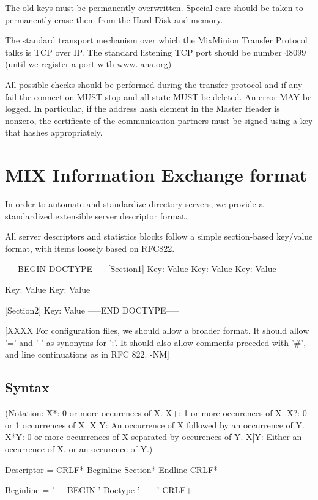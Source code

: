 The old keys must be permanently overwritten. Special care should be
taken to permanently erase them from the Hard Disk and memory. 

The standard transport mechanism over which the MixMinion Transfer
Protocol talks is TCP over IP. The standard listening TCP port should be 
number 48099 (until we register a port with www.iana.org)

All possible checks should be performed during the transfer protocol
and if any fail the connection MUST stop and all state MUST
be deleted. An error MAY be logged. In particular, if the address
hash element in the Master Header is nonzero, the certificate of
the communication partners must be signed using a key that hashes
appropriately.

\section{MIX Information Exchange format}

In order to automate and standardize directory servers, we provide 
a standardized extensible server descriptor format.

All server descriptors and statistics blocks follow a simple
section-based key/value format, with items loosely based on RFC822.

-----BEGIN DOCTYPE-----
[Section1]
Key: Value
Key: Value
Key: Value

Key: Value
Key: Value

[Section2]
Key: Value
-----END DOCTYPE-----

[XXXX For configuration files, we should allow a broader format.  It
  should allow '=' and ' ' as synonyms for ':'.  It should also allow
  comments preceded with '#', and line continuations as in RFC 822. -NM]

\subsection{Syntax}

(Notation:  X*: 0 or more occurences of X.
            X+: 1 or more occurences of X.
	    X?: 0 or 1 occurrences of X.
            X Y: An occurrence of X followed by an occurrence of Y.
	    X*{Y}: 0 or more occurrences of X separated by occurences
                  of Y.
            X|Y: Either an occurrence of X, or an occurence of Y.)

Descriptor = CRLF* Beginline Section* Endline CRLF*

Beginline = '-----BEGIN ' Doctype '------' CRLF+

